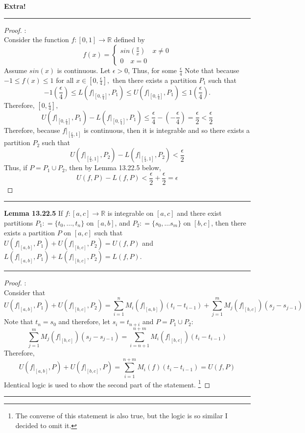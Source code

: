 \documentclass[openany, amssymb, psamsfonts]{amsart}
\newcommand{\bbR}{\mathbb{R}}
\theoremstyle{definition}
\numberwithin{equation}{section}
\begin{document}
\textbf{Extra!}
\vspace{4pt}     \hrule   \vspace{4pt}  \begin{proof}:\\
    Consider the function $f: [0,1] \to \bbR$ defined by \[f(x) = \begin{cases}
        sin(\frac{\pi}{x}) \quad x\neq 0\\
        0 \quad x = 0
    \end{cases}\]
Assume $sin(x)$ is continuous. Let $\epsilon>0$, Thus, for some $\frac{\epsilon}{4}$ Note that because $-1\leq f(x)\leq 1$ for all $x\in [0,\frac{\epsilon}{4}],$ then there exists a partition $P_1$ such that \[-1(\frac{\epsilon}{4})\leq L(f|_{[0,\frac{\epsilon}{4}]},P_1)\leq U(f|_{[0,\frac{\epsilon}{4}]},P_1)\leq 1(\frac{\epsilon}{4}).\] Therefore, $[0, \frac{\epsilon}{4}],$ \[U(f|_{[0,\frac{\epsilon}{4}]},P_1) - L(f|_{[0,\frac{\epsilon}{4}]},P_1) \leq \frac{\epsilon}{4} - (-\frac{\epsilon}{4}) = \frac{\epsilon}{2}<\frac{\epsilon}{2}\]
Therefore, because $f|_{[\frac{\epsilon}{4}, 1]}$ is continuous, then it is integrable and so there exists a partition $P_2$ such that \[U(f|_{[\frac{\epsilon}{4}, 1]}, P_2) - L(f|_{[\frac{\epsilon}{4}, 1]}, P_2) < \frac{\epsilon}{2}\] 
Thus, if $P = P_1 \cup P_2$, then by Lemma 13.22.5 below, \[U(f,P) - L(f,P) < \frac{\epsilon}{2} + \frac{\epsilon}{2}  = \epsilon\]
\end{proof}\vspace{4pt}     \hrule   \vspace{4pt} 

\textbf{Lemma 13.22.5}
If $f\colon [a,c] \to \bbR$ is integrable on $[a,c]$ and there exist partitions $P_1: = \{t_0, \dots, t_n\}$ on $[a,b]$, and $P_2: = \{s_0, \dots s_m\}$ on $[b,c]$, then there exists a partition $P$ on $[a,c]$ such that $U(f|_{[a,b]}, P_1) + U(f|_{[b,c]}, P_2) = U(f,P)$ and $L(f|_{[a,b]}, P_1) + L(f|_{[b,c]}, P_2) = L(f,P)$.
\vspace{4pt}     \hrule   \vspace{4pt}  \begin{proof}:\\
Consider that \[U(f|_{[a,b]},P_1) + U(f|_{[b,c]},P_2) = \sum_{i=1}^nM_i(f|_{[a,b]})(t_{i}-t_{i-1}) + \sum_{j=1}^mM_j(f|_{[b,c]})(s_{j}-s_{j-1})\] Note that $t_n = s_0$ and therefore, let $s_i= t_{n+i}$ and $P = P_1 \cup P_2$: \[\sum_{j=1}^mM_j(f|_{[b,c]})(s_{j}-s_{j-1}) = \sum_{i=n+1}^{n+m}M_i(f|_{[b,c]})(t_{i}-t_{i-1})\] Therefore, \[U(f|_{[a,b]},P) + U(f|_{[b,c]},P) =\sum_{i=1}^{n+m}M_i(f)(t_{i} - t_{i-1}) = U(f,P)\] Identical logic is used to show the second part of the statement. \footnote{The converse of this statement is also true, but the logic is so similar I decided to omit it.}
\end{proof}\vspace{4pt}     \hrule   \vspace{4pt} 
\end{document}
